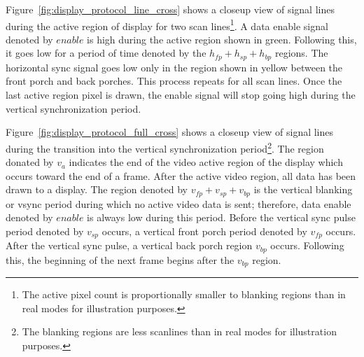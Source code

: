     Figure~\ref{fig:display_protocol_line_cross} shows a closeup view of signal lines during the active region of display for two scan lines\footnote{The active pixel count is proportionally smaller to blanking regions than in real modes for illustration purposes.}. A data enable signal denoted by $enable$ is high during the active region shown in green. Following this, it goes low for a period of time denoted by the $h_{fp}+h_{sp}+h_{bp}$ regions. The horizontal sync signal goes low only in the region shown in yellow between the front porch and back porches. This process repeats for all scan lines. Once the last active region pixel is drawn, the enable signal will stop going high during the vertical synchronization period.


    Figure~\ref{fig:display_protocol_full_cross} shows a closeup view of signal lines during the transition into the vertical synchronization period\footnote{The blanking regions are less scanlines than in real modes for illustration purposes.}. The region donated by $v_a$ indicates the end of the video active region of the display which occurs toward the end of a frame. After the active video region, all data has been drawn to a display. The region denoted by $v_{fp}+v_{sp}+v_{bp}$ is the vertical blanking or vsync period during which no active video data is sent; therefore, data enable denoted by $enable$ is always low during this period. Before the vertical sync pulse period denoted by $v_{sp}$ occurs, a vertical front porch period denoted by $v_{fp}$ occurs. After the vertical sync pulse, a vertical back porch region $v_{bp}$ occurs. Following this, the beginning of the next frame begins after the $v_{bp}$ region.

